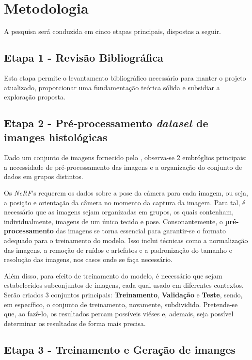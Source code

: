 \section{Metodologia}

A pesquisa será conduzida em cinco etapas principais, dispostas a seguir.


\subsection{Etapa 1 - Revisão Bibliográfica}

Esta etapa permite o levantamento bibliográfico necessário para manter o projeto atualizado, proporcionar uma fundamentação teórica sólida e subsidiar a exploração proposta.


\subsection{Etapa 2 - Pré-processamento \textit{dataset} de imanges histológicas}

  Dado um conjunto de imagens fornecido pelo %
  , observa-se 2 embróglios principais: a necessidade de pré-processamento das imagens e a organização do conjunto de dados em grupos distintos. 
  
  Os \textit{NeRF}'s requerem os dados sobre a pose da câmera para cada imagem, ou seja, a posição e orientação da câmera no momento da captura da imagem. Para tal, é necessário que as imagens sejam organizadas em grupos, os quais contenham, individualmente, imagens de um único tecido e pose. Consonantemente, o \textbf{pré-processamento} das imagens se torna essencial para garantir-se o formato adequado para o treinamento do modelo. Isso inclui técnicas como a normalização das imagens, a remoção de ruídos e artefatos e a padronização do tamanho e resolução das imagens, nos casos onde se faça necessário.

  Além disso, para efeito de treinamento do modelo, é necessário que sejam estabelecidos subconjuntos de imagens, cada qual usado em diferentes contextos. Serão criados 3 conjuntos principais: \textbf{Treinamento}, \textbf{Validação} e  \textbf{Teste}, sendo, em específico, o conjunto de treinamento, novamente, subdividido. Pretende-se que, ao fazê-lo, os resultados percam possíveis viéses e, ademais, seja possível determinar os resultados de forma mais precisa.

\subsection{Etapa 3 - Treinamento e Geração de imanges}

